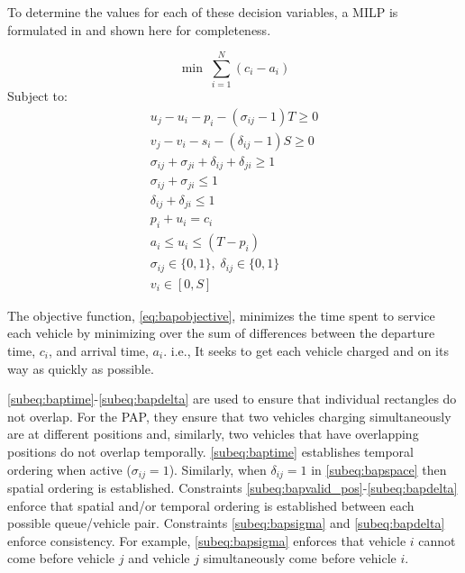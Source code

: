 \documentclass[11pt,a4paper,final]{article}
\begin{document}
To determine the values for each of these decision variables, a MILP is formulated in \cite{Qarebagh2019} and shown
here for completeness.

\begin{equation}
	\label{eq:bapobjective}
	\min\; \sum_{i=1}^N (c_i - a_i)
\end{equation}
Subject to:
\begin{subequations}
\label{eq:bapconstrs}
\begin{align}
    u_j - u_i - p_i - (\sigma_{ij} - 1)T \geq 0                  \label{subeq:baptime}          \\
    v_j - v_i - s_i - (\delta_{ij} - 1)S \geq 0                \label{subeq:bapspace}           \\
    \sigma_{ij} + \sigma_{ji} + \delta_{ij} + \delta_{ji} \geq 1 \label{subeq:bapvalid_pos}     \\
    \sigma_{ij} + \sigma_{ji} \leq 1                              \label{subeq:bapsigma}        \\
    \delta_{ij} + \delta_{ji} \leq 1                              \label{subeq:bapdelta}        \\
    p_i + u_i = c_i                                               \label{subeq:bapdetach}       \\
    a_i \leq u_i \leq (T - p_i)                                   \label{subeq:bapvalid_starts} \\
    \sigma_{ij} \in \{0,1\},\;\delta_{ij} \in \{0,1\}\;           \label{subeq:bapsdspace}      \\
    v_i \in [0, S ]                                               \label{subeq:bapvspace}
\end{align}
\end{subequations}

\noindent

The objective function, \autoref{eq:bapobjective}, minimizes the time spent to service each vehicle by minimizing over
the sum of differences between the departure time, \(c_i\), and arrival time, \(a_i\). i.e., It seeks to get each vehicle
charged and on its way as quickly as possible.

\autoref{subeq:baptime}-\autoref{subeq:bapdelta} are used to ensure that individual rectangles do not overlap. For the
PAP, they ensure that two vehicles charging simultaneously are at different positions and, similarly, two vehicles that
have overlapping positions do not overlap temporally. \autoref{subeq:baptime} establishes temporal ordering when active
(\(\sigma_{ij}=1\)). Similarly, when \(\delta_{ij} =1\) in \autoref{subeq:bapspace} then spatial ordering is established. Constraints
\autoref{subeq:bapvalid_pos}-\autoref{subeq:bapdelta} enforce that spatial and/or temporal ordering is established
between each possible queue/vehicle pair. Constraints \autoref{subeq:bapsigma} and \autoref{subeq:bapdelta} enforce
consistency. For example, \autoref{subeq:bapsigma} enforces that vehicle \(i\) cannot come before vehicle \(j\) and vehicle
\(j\) simultaneously come before vehicle \(i\).
\end{document}
